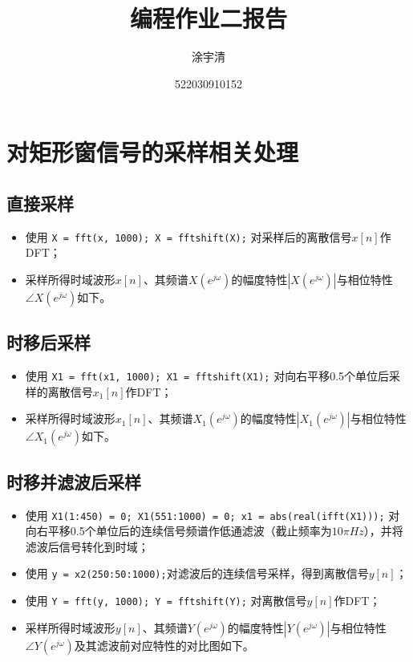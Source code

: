 \documentclass[UTF8,a4paper,12pt]{ctexart}
\title{\textbf{\Large{编程作业二报告}}}
\author{涂宇清}
\date{522030910152}
\begin{document}
 
\maketitle
\setcounter{page}{1}        %
 
 
\section{对矩形窗信号的采样相关处理}

\subsection{直接采样}
\begin{itemize}
    \item 使用 \verb|X = fft(x, 1000); X = fftshift(X);| 对采样后的离散信号\(x[n]\)作DFT；
    \item 采样所得时域波形\(x[n]\)、其频谱\(X(e^{j\omega})\)的幅度特性\(|X(e^{j\omega})|\)与相位特性\(\angle X(e^{j\omega})\)如下。
\end{itemize}

\begin{figure}[H]   %
  \centering
\end{figure}

\subsection{时移后采样}
\begin{itemize}
  \item 使用 \verb|X1 = fft(x1, 1000); X1 = fftshift(X1);| 对向右平移0.5个单位后采样的离散信号\(x_1[n]\)作DFT；
  \item 采样所得时域波形\(x_1[n]\)、其频谱\(X_1(e^{j\omega})\)的幅度特性\(|X_1(e^{j\omega})|\)与相位特性\(\angle X_1(e^{j\omega})\)如下。
\end{itemize}

\begin{figure}[H]   %
\centering
\end{figure}

\subsection{时移并滤波后采样}
\begin{itemize}
  \item 使用 \verb|X1(1:450) = 0; X1(551:1000) = 0; x1 = abs(real(ifft(X1)));| 对向右平移0.5个单位后的连续信号频谱作低通滤波（截止频率为\(10\pi Hz\)），并将滤波后信号转化到时域；
  \item 使用 \verb|y = x2(250:50:1000);|对滤波后的连续信号采样，得到离散信号\(y[n]\)；
  \item 使用 \verb|Y = fft(y, 1000); Y = fftshift(Y);| 对离散信号\(y[n]\)作DFT；
  \item 采样所得时域波形\(y[n]\)、其频谱\(Y(e^{j\omega})\)的幅度特性\(|Y(e^{j\omega})|\)与相位特性\(\angle Y(e^{j\omega})\)及其滤波前对应特性的对比图如下。
\end{itemize}
\end{document}

